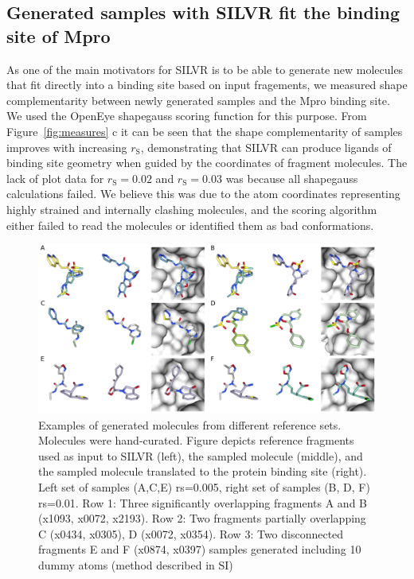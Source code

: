 \documentclass[journal=jacsat,manuscript=article]{achemso}
\begin{document}
\subsection{Generated samples with SILVR fit the binding site of Mpro}
As one of the main motivators for SILVR is to be able to generate new molecules that fit directly into a binding site based on input fragements, we measured shape complementarity between newly generated samples and the Mpro binding site. We used the OpenEye shapegauss scoring function for this purpose. From Figure~\ref{fig:measures} c it can be seen that the shape complementarity of samples improves with increasing $r_{\mathrm{S}}$, demonstrating that SILVR can produce ligands of binding site geometry when guided by the coordinates of fragment molecules. The lack of plot data for $r_{\mathrm{S}}=0.02$ and $r_{\mathrm{S}}=0.03$ was because all shapegauss calculations failed. We believe this was due to the atom coordinates representing highly strained and internally clashing molecules, and the scoring algorithm either failed to read the molecules or identified them as bad conformations.

\begin{figure}
    \centering
    \includegraphics[width=\textwidth]{paper/Figures/Fig4/fig_4_ref_sample_bound.png}
    \caption{Examples of generated molecules from different reference sets. Molecules were hand-curated. Figure depicts reference fragments used as input to SILVR (left), the sampled molecule (middle), and the sampled molecule translated to the protein binding site (right). Left set of samples (A,C,E) rs=0.005, right set of samples (B, D, F) rs=0.01. Row 1: Three significantly overlapping fragments A and B (x1093, x0072, x2193). Row 2: Two fragments partially overlapping C (x0434, x0305), D (x0072, x0354). Row 3: Two disconnected fragments E and F (x0874, x0397) samples generated including 10 dummy atoms (method described in SI)}
    \label{fig:samples}
\end{figure}
\end{document}

